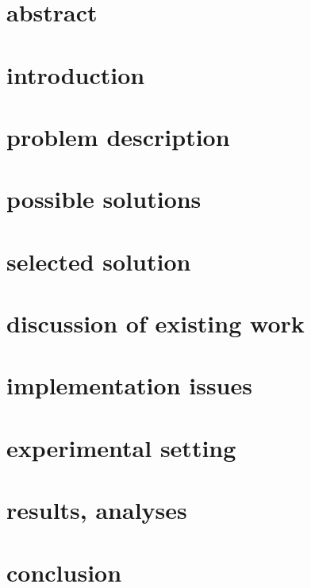 \documentclass[12pt]{amsart}
\title{}
\author{}
\date{} %
\begin{document}
\maketitle
\tableofcontents

\section{abstract}
\section{introduction}
\section{problem description}
\section{possible solutions}
\section{selected solution}
\section{discussion of existing work}
\section{implementation issues}
\section{experimental setting}
\section{results, analyses}
\section{conclusion}
\end{document}
